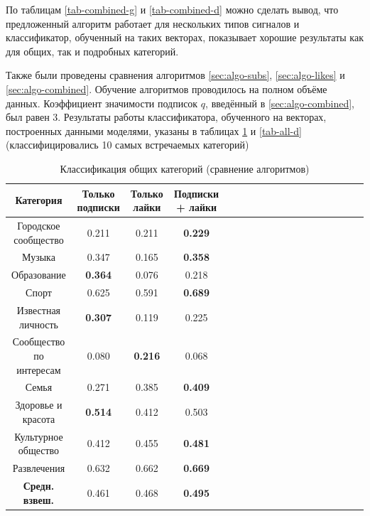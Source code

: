 \documentclass[times,specification,annotation]{itmo-student-thesis}
\begin{document}
По таблицам \ref{tab-combined-g} и \ref{tab-combined-d} можно сделать вывод, что предложенный алгоритм работает для нескольких типов сигналов и классификатор, обученный на таких векторах, показывает хорошие результаты как для общих, так и подробных категорий.

Также были проведены сравнения алгоритмов \ref{sec:algo-subs},  \ref{sec:algo-likes} и  \ref{sec:algo-combined}. Обучение алгоритмов проводилось на полном объёме данных. Коэффициент значимости подписок $q$, введённый в \ref{sec:algo-combined}, был равен 3. Результаты работы классификатора, обученного на векторах, построенных данными моделями, указаны в таблицах \ref{tab-all-g} и  \ref{tab-all-d} (классифицировались 10 самых встречаемых категорий)

\begin{table}[!h]
\caption{Классификация общих категорий (сравнение алгоритмов)}\label{tab-all-g}
\centering
\begin{tabular}{|*{18}{c|}}\hline
Категория & Только подписки  & Только лайки & Подписки + лайки \\\hline
Городское сообщество         & 0.211 & 0.211 &\textbf{0.229}  \\\hline
Музыка         & 0.347 & 0.165 & \textbf{0.358}  \\\hline
Образование         & \textbf{0.364} & 0.076 & 0.218 \\\hline
Спорт         & 0.625 & 0.591 & \textbf{0.689}    \\\hline
Известная личность         & \textbf{0.307} & 0.119 & 0.225 \\\hline
Сообщество по интересам         & 0.080 & \textbf{0.216} & 0.068 \\\hline
Семья         & 0.271 & 0.385 & \textbf{0.409} \\\hline
Здоровье и красота          & \textbf{0.514} & 0.412 & 0.503 \\\hline
Культурное общество         & 0.412 & 0.455 & \textbf{0.481} \\\hline
Развлечения           & 0.632 & 0.662 & \textbf{0.669} \\\hline
\textbf{Средн. взвеш.}  & 0.461 & 0.468 & \textbf{0.495}  \\\hline
\end{tabular}
\end{table}
\end{document}
